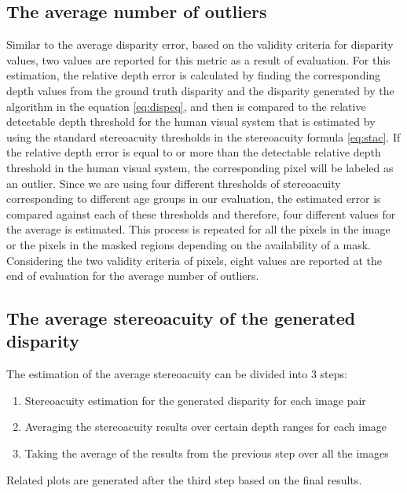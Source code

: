 \subsection{The average number of outliers}
Similar to the average disparity error, based on the validity criteria for disparity values, 
two values are reported for this metric as a result of evaluation. For this estimation, the relative depth error is calculated by finding the corresponding depth values
from the ground truth disparity and the disparity generated by the algorithm in the equation \ref{eq:dispeq}, and then is compared to the relative 
detectable depth threshold for the human visual system that is estimated by using the standard stereoacuity thresholds
in the stereoacuity formula \ref{eq:stac}. If the relative depth error is equal to or more than the detectable relative depth threshold in the human visual system,
the corresponding pixel will be labeled as an outlier. Since we are using four different thresholds of stereoacuity corresponding to different
age groups in our evaluation, the estimated error is compared against each of these thresholds and therefore,
four different values for the average is estimated. This process is repeated for all the pixels in the image or 
the pixels in the masked regions depending on the availability of a mask.
Considering the two validity criteria of pixels, eight values are reported at the end of evaluation for the average number of outliers.

\subsection{The average stereoacuity of the generated disparity}
The estimation of the average stereoacuity can be divided into 3 steps:

\begin{enumerate}
\item Stereoacuity estimation for the generated disparity for each image pair
\item Averaging the stereoacuity results over certain depth ranges for each image
\item Taking the average of the results from the previous step over all the images
\end{enumerate}
Related plots are generated after the third step based on the final results.

